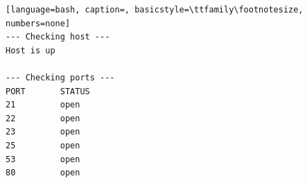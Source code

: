 \documentclass[12pt]{report}
\begin{document}
\begin{lstlisting}[language=bash, caption=, basicstyle=\ttfamily\footnotesize, numbers=none]
--- Checking host ---                                                                                                                                                                                                
Host is up                                                                                                                                                                                                           
                                                                                                                                                                                                                     
--- Checking ports ---                                                                                                                                                                                               
PORT       STATUS                                                                                                                                                                                                    
21         open                                                                                                                                                                                                      
22         open                                                                                                                                                                                                      
23         open                                                                                                                                                                                                      
25         open                                                                                                                                                                                                      
53         open                                                                                                                                                                                                      
80         open                                                                                                                                                                                                      
                                                                                                                                                                                                                     

\end{lstlisting}
\end{document}
